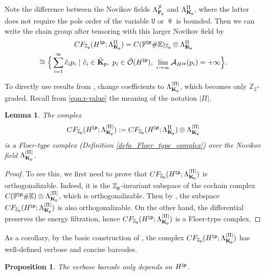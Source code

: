 \documentclass[reqno, 10pt]{amsart}
\numberwithin{equation}{section}
\numberwithin{equation}{section}
\newtheorem{prop}[thm]{Proposition}
\newtheorem{lemma}[thm]{Lemma}
\theoremstyle{definition}
\theoremstyle{remark}
\newcommand{\beqn}{\begin{equation*}}
\newcommand{\eeqn}{\end{equation*}}
\newcommand{\mb}{\mathbb}
\newcommand{\mc}{\mathcal}
\newcommand{\p}{{\sf p}}
\newcommand{\fp}{{\bf F}_{\sf p}}
\newcommand{\kp}{{\bf K}_{\sf p}}
\newcommand{\tkp}{\wt{\bf K}_{\sf p}}
\newcommand{\zp}{{{\mb Z}_{\sf p}}}
\newcommand{\ep}{{{\mathbb E}}}
\newcommand{\tu}{\mathtt{U}}
\newcommand{\wt}{\widetilde}
\begin{document}
Note the difference between the Novikov fields $\Lambda_{\fp}^{\mb\Pi}$ and $\Lambda_{\kp}^{\Pi}$, where the latter does not require the pole order of the variable $\tu$ or $\uptheta$ is bounded. Then we can write the chain group after tensoring with this larger Novikov field by
\begin{multline*}
CF_{\zp}(H^{\natural \p}; \Lambda_{\kp}^\Pi)= C({\mb F}^{\natural \p} \# \ep)_{\zp}  \otimes \Lambda_{\kp}^\Pi\\
\cong \Big\{  \sum_{i=1}^\infty \tilde c_i p_i \ |\ \tilde c_i \in \tkp,\ p_i \in  \tilde {\mc O}(H^{\natural \p}),\ \lim_{i \to \infty} {\mc A}_{H^{\natural \p}}(p_i) = +\infty \Big\}.
\end{multline*}


To directly use results from \cite{Usher_Zhang_2016}, change coefficients to $\Lambda_{\kp}^{|\Pi|}$, which becomes only ${\mb Z}_2$-graded. Recall from \eqref{eqn:r-value} the meaning of the notation $|\Pi|$.

\begin{lemma}
The complex 
\beqn
CF_{\zp}(H^{\natural \p}; \Lambda_{\kp}^{|\Pi|}):= CF_{\zp}(H^{\natural \p}; \Lambda_{\kp}^\Pi) \otimes \Lambda_{\kp}^{|\Pi|}
\eeqn
is a Floer-type complex (Definition \ref{defn_Floer_type_complex}) over the Novikov field $\Lambda_{\kp}^{|\Pi|}$.
\end{lemma}

\begin{proof}
To see this, we first need to prove that $CF_{\zp}(H^{\natural  \p}; \Lambda_{\kp}^{|\Pi|})$ is orthogonalizable. Indeed, it is the $\zp$-invariant subspace of the cochain complex $C( {\mb F}^{\natural \p} \# {\mb E}) \otimes \Lambda_{\kp}^{|\Pi|}$, which is orthogonalizable. Then by \cite[Corollary 2.17]{Usher_Zhang_2016}, the subspace $CF_{\zp}(H^{\natural \p}; \Lambda_{\kp}^{|\Pi|})$ is also orthogonalizable. On the other hand, the differential preserves the energy filtration, hence $CF_{\zp}(H^{\natural \p}; \Lambda_{\kp}^{|\Pi|})$ is a Floer-type complex.
\end{proof}

As a corollary, by the basic construction of \cite{Usher_Zhang_2016}, the complex $CF_{\zp}(H^{\natural \p}; \Lambda_{\kp}^{|\Pi|})$ has  well-defined verbose and concise barcodes. 

\begin{prop}
The verbose barcode only depends on $H^{\natural \p}$.
\end{prop}
\end{document}

